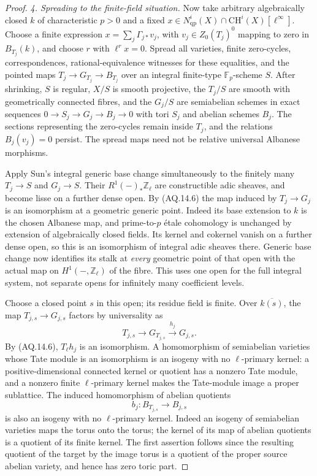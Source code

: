 \begin{proof}
\emph{4. Spreading to the finite-field situation.}
Now take arbitrary algebraically closed $k$ of characteristic
$p>0$ and a fixed
$x\in N^i_{\mathrm{qp}}(X)\cap\mathrm{CH}^i(X)[\ell^\infty]$.
Choose a finite expression
$x=\sum_j\Gamma_{j*}v_j$, with $v_j\in Z_0(T_j)^0$
mapping to zero in $B_{T_j}(k)$, and choose $r$ with
$\ell^r x=0$. Spread all varieties, finite zero-cycles,
correspondences, rational-equivalence witnesses for these
equalities, and the pointed maps
$T_j\to G_{T_j}\to B_{T_j}$ over an integral finite-type
$\mathbb F_p$-scheme $S$. After shrinking, $S$ is regular,
$X/S$ is smooth projective, the $T_j/S$ are smooth with
geometrically connected fibres, and the $G_j/S$ are
semiabelian schemes in exact sequences
$0\to S_j\to G_j\to B_j\to0$ with tori $S_j$ and
abelian schemes $B_j$. The sections representing the
zero-cycles remain inside $T_j$, and the relations
$B_j(v_j)=0$ persist. The spread maps need not be
relative universal Albanese morphisms.

Apply Sun's integral generic base change simultaneously to
the finitely many $T_j\to S$ and $G_j\to S$. Their
$R^1(-)_*\mathbb Z_\ell$ are constructible adic sheaves,
and become lisse on a further dense open. By (AQ.14.6)
the map induced by $T_j\to G_j$ is an isomorphism at
a geometric generic point. Indeed its base extension
to $k$ is the chosen Albanese map, and prime-to-$p$
\'etale cohomology is unchanged by extension of
algebraically closed fields. Its kernel and cokernel
vanish on a further dense open, so this is an
isomorphism of integral adic sheaves there. Generic
base change now identifies its stalk at \emph{every}
geometric point of that open with the actual map
on $H^1(-,\mathbb Z_\ell)$ of the fibre. This uses one
open for the full integral system, not separate opens
for infinitely many coefficient levels.

Choose a closed point $s$ in this open; its residue
field is finite. Over $\overline{k(s)}$, the map
$T_{j,s}\to G_{j,s}$ factors by universality as
\[
 T_{j,s}\longrightarrow G_{T_{j,s}}
                  \xrightarrow{h_j}G_{j,s}.
\]
By (AQ.14.6), $T_\ell h_j$ is an isomorphism. A
homomorphism of semiabelian varieties whose Tate module
is an isomorphism is an isogeny with no $\ell$-primary
kernel: a positive-dimensional connected kernel or
quotient has a nonzero Tate module, and a nonzero finite
$\ell$-primary kernel makes the Tate-module image a
proper sublattice. The induced homomorphism of abelian
quotients
\[
 b_j:B_{T_{j,s}}\longrightarrow B_{j,s}
\]
is also an isogeny with no $\ell$-primary kernel.
Indeed an isogeny of semiabelian varieties maps the
torus onto the torus; the kernel of its map of abelian
quotients is a quotient of its finite kernel. The first
assertion follows since the resulting quotient of the
target by the image torus is a quotient of the proper
source abelian variety, and hence has zero toric part.


\end{proof}
